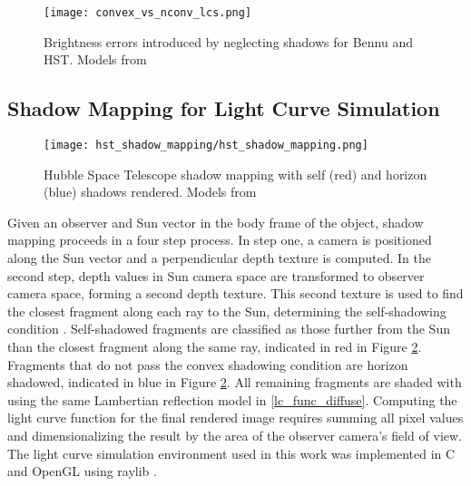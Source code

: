 \begin{figure}[!htb]
  \centering
  \texttt{[image: convex\_vs\_nconv\_lcs.png]}
  \caption{Brightness errors introduced by neglecting shadows for Bennu and HST. Models from \cite{nasa_models}}
  \label{fig:hst_bennu_shadows}
\end{figure}

\subsection{Shadow Mapping for Light Curve Simulation}

\begin{figure}[!htb]
  \centering
  \texttt{[image: hst\_shadow\_mapping/hst\_shadow\_mapping.png]}
  \caption{Hubble Space Telescope shadow mapping with self (red) and horizon (blue) shadows rendered. Models from \cite{nasa_models}}
  \label{fig:hst_shadows_map}
\end{figure}

Given an observer and Sun vector in the body frame of the object, shadow mapping proceeds in a four step process. In step one, a camera is positioned along the Sun vector and a perpendicular depth texture is computed. In the second step, depth values in Sun camera space are transformed to observer camera space, forming a second depth texture. This second texture is used to find the closest fragment along each ray to the Sun, determining the self-shadowing condition \cite{brabec2002}. Self-shadowed fragments are classified as those further from the Sun than the closest fragment along the same ray, indicated in red in Figure \ref{fig:hst_shadows_map}. Fragments that do not pass the convex shadowing condition are horizon shadowed, indicated in blue in Figure \ref{fig:hst_shadows_map}. All remaining fragments are shaded with using the same Lambertian reflection model in \ref{lc_func_diffuse}. Computing the light curve function for the final rendered image requires summing all pixel values and dimensionalizing the result by the area of the observer camera's field of view. The light curve simulation environment used in this work was implemented in C and OpenGL using raylib \cite{raylib}.
